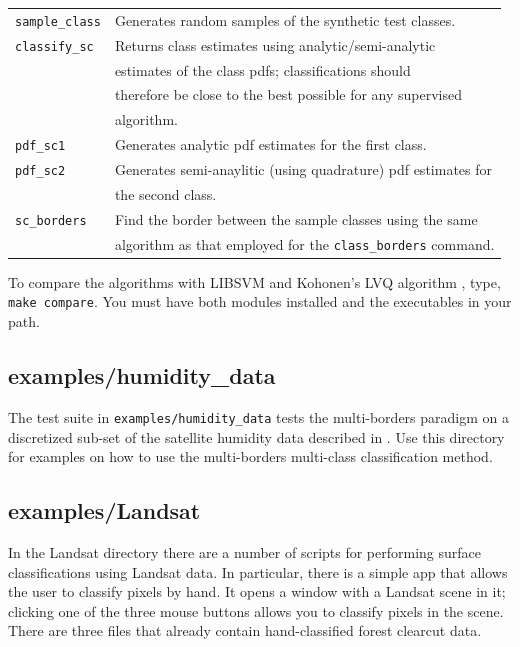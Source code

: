 \documentclass[12pt]{article}
\begin{document}
\begin{tabular}{ll}
\verb/sample_class/ & Generates random samples of the synthetic test classes.\\
\verb/classify_sc/ & Returns class estimates using analytic/semi-analytic \\
		   & estimates of the class pdfs; classifications should \\
		     & therefore be close to the best possible for any supervised \\
       & algorithm.\\
\verb/pdf_sc1/ & Generates analytic pdf estimates for the first class.\\
\verb/pdf_sc2/ & Generates semi-anaylitic (using quadrature) pdf estimates for \\
	       & the second class.\\
\verb/sc_borders/ & Find the border between the sample classes using the same \\
		  & algorithm as that employed for the \verb"class_borders" command.
\end{tabular}

  To compare the algorithms with LIBSVM \citep{Chang_Lin2011} and Kohonen's LVQ algorithm \citep{Kohonen2000}, type, \verb"make compare".  You must have both modules installed and the executables in your path.

\subsection{examples/humidity\_data}

The test suite in \verb"examples/humidity_data" tests the multi-borders paradigm on a discretized sub-set of the satellite humidity data described in \citet{Mills2009}.  Use this directory for examples on how to use the multi-borders multi-class classification method.

\subsection{examples/Landsat}

In the Landsat directory there are a number of scripts for performing surface classifications using Landsat data.  In particular, there is a simple app that allows the user to classify pixels by hand.  It opens a window with a Landsat scene in it; clicking one of the three mouse buttons allows you to classify pixels in the scene.  There are three files that already contain hand-classified forest clearcut data.
\end{document}
